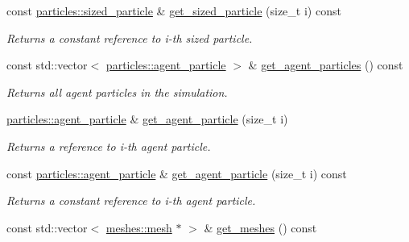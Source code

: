 \begin{DoxyCompactItemize}
\mbox{\label{classphysim_1_1simulator_a593cbb6a85d914bd4044cb4db6cc523b}} 
const \hyperlink{classphysim_1_1particles_1_1sized__particle}{particles\+::sized\+\_\+particle} \& \hyperlink{classphysim_1_1simulator_a593cbb6a85d914bd4044cb4db6cc523b}{get\+\_\+sized\+\_\+particle} (size\+\_\+t i) const
\begin{DoxyCompactList}\small\item\em Returns a constant reference to i-\/th sized particle. \end{DoxyCompactList}\item 
const std\+::vector$<$ \hyperlink{classphysim_1_1particles_1_1agent__particle}{particles\+::agent\+\_\+particle} $>$ \& \hyperlink{classphysim_1_1simulator_a043656dfeb0ce60416c234abb2280383}{get\+\_\+agent\+\_\+particles} () const
\begin{DoxyCompactList}\small\item\em Returns all agent particles in the simulation. \end{DoxyCompactList}\item 
\mbox{\label{classphysim_1_1simulator_a1b083b545660929082e1f646ff06d10f}} 
\hyperlink{classphysim_1_1particles_1_1agent__particle}{particles\+::agent\+\_\+particle} \& \hyperlink{classphysim_1_1simulator_a1b083b545660929082e1f646ff06d10f}{get\+\_\+agent\+\_\+particle} (size\+\_\+t i)
\begin{DoxyCompactList}\small\item\em Returns a reference to i-\/th agent particle. \end{DoxyCompactList}\item 
\mbox{\label{classphysim_1_1simulator_a6e285c59b113d384a9121e619f8fbc4f}} 
const \hyperlink{classphysim_1_1particles_1_1agent__particle}{particles\+::agent\+\_\+particle} \& \hyperlink{classphysim_1_1simulator_a6e285c59b113d384a9121e619f8fbc4f}{get\+\_\+agent\+\_\+particle} (size\+\_\+t i) const
\begin{DoxyCompactList}\small\item\em Returns a constant reference to i-\/th agent particle. \end{DoxyCompactList}\item 
const std\+::vector$<$ \hyperlink{classphysim_1_1meshes_1_1mesh}{meshes\+::mesh} $\ast$ $>$ \& \hyperlink{classphysim_1_1simulator_a515217acebf6d4ae784af02a60bede00}{get\+\_\+meshes} () const

\end{DoxyCompactItemize}
